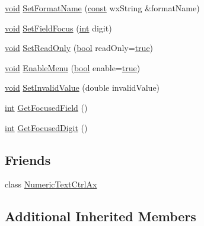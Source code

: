 \begin{DoxyCompactItemize}
\item 
\hyperlink{sound_8c_ae35f5844602719cf66324f4de2a658b3}{void} \hyperlink{class_numeric_text_ctrl_ae90054f51c3f535249d2a1224e375ed7}{Set\+Format\+Name} (\hyperlink{getopt1_8c_a2c212835823e3c54a8ab6d95c652660e}{const} wx\+String \&format\+Name)
\item 
\hyperlink{sound_8c_ae35f5844602719cf66324f4de2a658b3}{void} \hyperlink{class_numeric_text_ctrl_a8ef4b534cf8fa73e2fda3543bf32e491}{Set\+Field\+Focus} (\hyperlink{xmltok_8h_a5a0d4a5641ce434f1d23533f2b2e6653}{int} digit)
\item 
\hyperlink{sound_8c_ae35f5844602719cf66324f4de2a658b3}{void} \hyperlink{class_numeric_text_ctrl_a4ea016562c538bd74c2c6e7df9f7daae}{Set\+Read\+Only} (\hyperlink{mac_2config_2i386_2lib-src_2libsoxr_2soxr-config_8h_abb452686968e48b67397da5f97445f5b}{bool} read\+Only=\hyperlink{mac_2config_2i386_2lib-src_2libsoxr_2soxr-config_8h_a41f9c5fb8b08eb5dc3edce4dcb37fee7}{true})
\item 
\hyperlink{sound_8c_ae35f5844602719cf66324f4de2a658b3}{void} \hyperlink{class_numeric_text_ctrl_a07d7959bd08c6cf9cb3230ff056b93ee}{Enable\+Menu} (\hyperlink{mac_2config_2i386_2lib-src_2libsoxr_2soxr-config_8h_abb452686968e48b67397da5f97445f5b}{bool} enable=\hyperlink{mac_2config_2i386_2lib-src_2libsoxr_2soxr-config_8h_a41f9c5fb8b08eb5dc3edce4dcb37fee7}{true})
\item 
\hyperlink{sound_8c_ae35f5844602719cf66324f4de2a658b3}{void} \hyperlink{class_numeric_text_ctrl_a69aecd197c44788387a686ddf21b9ab4}{Set\+Invalid\+Value} (double invalid\+Value)
\item 
\hyperlink{xmltok_8h_a5a0d4a5641ce434f1d23533f2b2e6653}{int} \hyperlink{class_numeric_text_ctrl_afe38bb5240b129b32ffc8906af95445b}{Get\+Focused\+Field} ()
\item 
\hyperlink{xmltok_8h_a5a0d4a5641ce434f1d23533f2b2e6653}{int} \hyperlink{class_numeric_text_ctrl_a9bc048c04d49a846bd04ee344c82c15e}{Get\+Focused\+Digit} ()
\end{DoxyCompactItemize}
\subsection*{Friends}
\begin{DoxyCompactItemize}
\item 
class \hyperlink{class_numeric_text_ctrl_a9e42609bb05ebc3b661b10cf8606b6e8}{Numeric\+Text\+Ctrl\+Ax}
\end{DoxyCompactItemize}
\subsection*{Additional Inherited Members}


